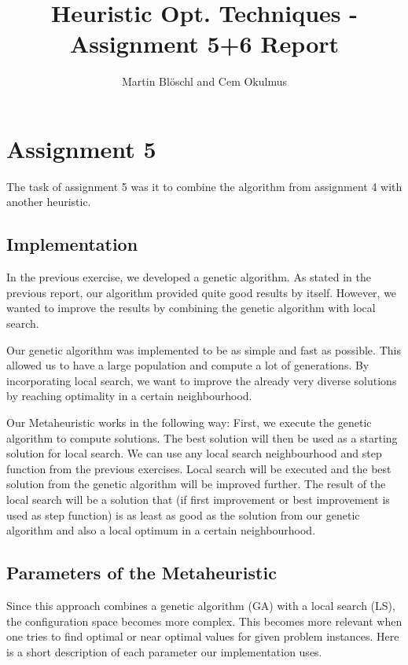 \documentclass [11pt]{article}
\begin{document}
\title{ Heuristic Opt. Techniques - Assignment 5+6 Report}
\author{ Martin Blöschl and Cem Okulmus }

\maketitle
\thispagestyle{empty}


\section{Assignment 5}

The task of assignment 5 was it to combine the algorithm from assignment 4 with another heuristic. 


\subsection{Implementation}

In the previous exercise, we developed a genetic algorithm. As stated in the previous report, our algorithm provided quite good results by itself. However, we wanted to improve the results by combining the genetic algorithm with local search.

Our genetic algorithm was implemented to be as simple and fast as possible. This allowed us to have a large population and compute a lot of generations. By incorporating local search, we want to improve the already very diverse solutions by reaching optimality in a certain neighbourhood.

Our Metaheuristic works in the following way: First, we execute the genetic algorithm to compute solutions. The best solution will then be used as a starting solution for local search. We can use any local search neighbourhood and step function from the previous exercises. Local search will be executed and the best solution from the genetic algorithm will be improved further. The result of the local search will  be a solution that (if first improvement or best improvement is used as step function) is as least as good as the solution from our genetic algorithm and also a local optimum in a certain neighbourhood.

\subsection{Parameters of the Metaheuristic}

Since this approach combines a genetic algorithm (GA) with a local search (LS), the configuration space becomes more complex. This becomes more relevant when one tries to find optimal or near optimal values for given problem instances. Here is a short description of each parameter our implementation uses. 
\end{document}
